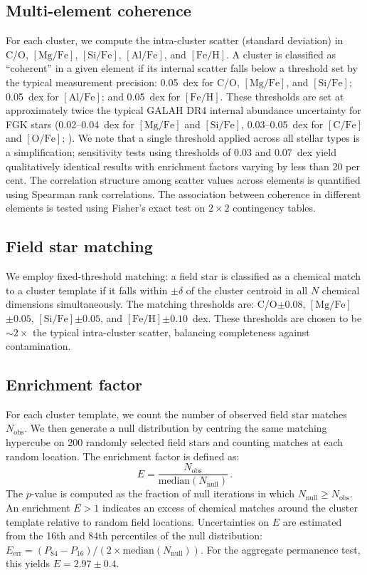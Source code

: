 \documentclass[fleqn,usenatbib]{mnras}
\newcommand{\feh}{$\mathrm{[Fe/H]}$\xspace}
\newcommand{\mgfe}{$\mathrm{[Mg/Fe]}$\xspace}
\newcommand{\sife}{$\mathrm{[Si/Fe]}$\xspace}
\newcommand{\alfe}{$\mathrm{[Al/Fe]}$\xspace}
\newcommand{\cfe}{$\mathrm{[C/Fe]}$\xspace}
\newcommand{\ofe}{$\mathrm{[O/Fe]}$\xspace}
\newcommand{\co}{C/O\xspace}
\begin{document}
\subsection{Multi-element coherence}
\label{sec:multielement}

For each cluster, we compute the intra-cluster scatter (standard deviation) in \co, \mgfe, \sife, \alfe, and \feh.
A cluster is classified as ``coherent'' in a given element if its internal scatter falls below a threshold set by the typical measurement precision: 0.05~dex for \co, \mgfe, and \sife; 0.05~dex for \alfe; and 0.05~dex for \feh.
These thresholds are set at approximately twice the typical GALAH DR4 internal abundance uncertainty for FGK stars (0.02--0.04~dex for \mgfe and \sife, 0.03--0.05~dex for \cfe and \ofe; \citealt{Buder2024}). We note that a single threshold applied across all stellar types is a simplification; sensitivity tests using thresholds of 0.03 and 0.07~dex yield qualitatively identical results with enrichment factors varying by less than 20 per cent.
The correlation structure among scatter values across elements is quantified using Spearman rank correlations.
The association between coherence in different elements is tested using Fisher's exact test on $2 \times 2$ contingency tables.

\subsection{Field star matching}
\label{sec:matching}

We employ fixed-threshold matching: a field star is classified as a chemical match to a cluster template if it falls within $\pm \delta$ of the cluster centroid in all $N$ chemical dimensions simultaneously.
The matching thresholds are: \co $\pm 0.08$, \mgfe $\pm 0.05$, \sife $\pm 0.05$, and \feh $\pm 0.10$~dex.
These thresholds are chosen to be ${\sim}2\times$ the typical intra-cluster scatter, balancing completeness against contamination.

\subsection{Enrichment factor}
\label{sec:enrichment}

For each cluster template, we count the number of observed field star matches $N_{\mathrm{obs}}$.
We then generate a null distribution by centring the same matching hypercube on 200 randomly selected field stars and counting matches at each random location.
The enrichment factor is defined as:
\begin{equation}
E = \frac{N_{\mathrm{obs}}}{\mathrm{median}(N_{\mathrm{null}})} \,.
\label{eq:enrichment}
\end{equation}
The $p$-value is computed as the fraction of null iterations in which $N_{\mathrm{null}} \geq N_{\mathrm{obs}}$.
An enrichment $E > 1$ indicates an excess of chemical matches around the cluster template relative to random field locations.
Uncertainties on $E$ are estimated from the 16th and 84th percentiles of the null distribution: $E_{\mathrm{err}} = (P_{84} - P_{16}) / (2 \times \mathrm{median}(N_{\mathrm{null}}))$. For the aggregate permanence test, this yields $E = 2.97 \pm 0.4$.
\end{document}
